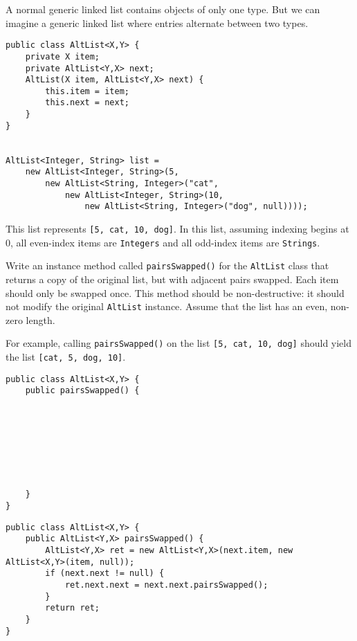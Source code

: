 \question

A normal generic linked list contains objects of only one type. But
we can imagine a generic linked list where entries alternate between two types.
\begin{lstlisting}
public class AltList<X,Y> {
    private X item;
    private AltList<Y,X> next;
    AltList(X item, AltList<Y,X> next) {
        this.item = item;
        this.next = next;
    }
}


AltList<Integer, String> list =
    new AltList<Integer, String>(5,
        new AltList<String, Integer>("cat",
            new AltList<Integer, String>(10,
                new AltList<String, Integer>("dog", null))));
\end{lstlisting}

This list represents \lstinline$[5, cat, 10, dog]$. In this list, assuming
indexing begins at 0, all even-index items are \lstinline$Integers$ and all
odd-index items are \lstinline$Strings$.

Write an instance method called \lstinline$pairsSwapped()$ for the
\lstinline$AltList$ class that returns a copy of the original list, but with
adjacent pairs swapped. Each item should only be swapped once. This method
should be non-destructive: it should not modify the original
\lstinline$AltList$ instance. Assume that the list has an even, non-zero
length.

For example, calling \lstinline$pairsSwapped()$ on the list \lstinline$[5, cat, 10, dog]$ should yield the list \lstinline$[cat, 5, dog, 10]$.
\ifprintanswers\else
\begin{lstlisting}
public class AltList<X,Y> {
    public pairsSwapped() {








    }
}
\end{lstlisting}
\fi

\begin{solution}
\begin{lstlisting}
public class AltList<X,Y> {
    public AltList<Y,X> pairsSwapped() {
        AltList<Y,X> ret = new AltList<Y,X>(next.item, new AltList<X,Y>(item, null));
        if (next.next != null) {
            ret.next.next = next.next.pairsSwapped();
        }
        return ret;
    }
} \end{lstlisting} \end{solution}
